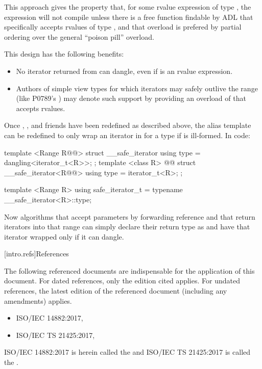 This approach gives  the property that,
for some rvalue expression  of type , the expression
will not compile unless there is a free function  findable by
ADL that specifically accepts rvalues of type , and that overload is
prefered by partial ordering over the general  ``poison
pill'' overload.

\pnum
This design has the following benefits:

\begin{itemize}
\item No iterator returned from 
can dangle, even if  is an rvalue expression.
\item Authors of simple view types for which iterators may safely outlive the
range (like P0789's ) may denote such support by providing an
overload of  that accepts rvalues.
\end{itemize}

\pnum
Once , , and friends have
been redefined as described above, the  alias template
can be redefined to only wrap an iterator in  for a
 type  if
 is ill-formed. In
code:

\begin{codeblock}
template <Range R@@>
struct __safe_iterator {
  using type = dangling<iterator_t<R>>;
};
template <class R>
  @@
struct __safe_iterator<R@@> {
  using type = iterator_t<R>;
};

template <Range R>
using safe_iterator_t = typename __safe_iterator<R>::type;
\end{codeblock}

Now algorithms that accept  parameters by forwarding reference and
that return iterators into that range can simply declare their return type as
 and have that iterator wrapped only if it can dangle.

[intro.refs]{References}

\pnum
The following referenced documents are indispensable for the
application of this document. For dated references, only the
edition cited applies. For undated references, the latest edition
of the referenced document (including any amendments) applies.

\begin{itemize}
\item ISO/IEC 14882:2017, 
\item ISO/IEC TS 21425:2017, 
\end{itemize}

ISO/IEC 14882:2017 is herein called the \defn{C\Rplus\Rplus\xspace Standard} and
ISO/IEC TS 21425:2017 is called the .
